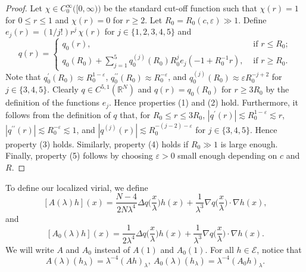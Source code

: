 \documentclass[a4paper,two-side,10pt]{amsart}
\newcommand{\R}{\mathbb{R}}
\numberwithin{equation}{section}
\begin{document}
\begin{proof}
Let $\chi\in C^\infty_0\big([0,\infty)\big)$ be the standard cut-off function such that $\chi(r)=1$ for $0\le r\le 1$ and  $\chi(r)=0$ for $r\ge 2$. Let $R_0=R_0(c,\varepsilon)\gg 1$. Define $e_j(r)=(1/j!)r^j\,\chi(r)$ for $j\in\{1,2,3,4,5\}$ and
\[
q(r)=\begin{cases}
q_0(r), &\text{ if }r\le R_0;\\
q_0(R_0)+\sum_{j=1}^5 q_0^{(j)}(R_0)R_0^j e_j(-1+R_0^{-1}r), &\text{ if }r\ge R_0.
\end{cases}
\]
Note that $q_0^\prime(R_0)\approx R_0^{1-\varepsilon}$,  $q_0^{\prime\prime} (R_0)\approx R_0^{-\varepsilon}$, and 
$q_0^{(j)}(R_0)\approx \varepsilon R_0^{-j+2}$ for $j\in\{3,4,5\}$.
Clearly $q\in C^{5,1} (\R^N)$ and $q(r)=q_0(R_0)$ for $r\ge 3R_0$ by the definition of the functions $e_j$. Hence properties (1) and (2) hold. Furthermore, it follows from the definition of $q$ that, for $R_0\le r\le 3R_0$, $|q^\prime (r)|\lesssim R_0^{1-\varepsilon}\lesssim r$, $|q^{\prime\prime}(r)|\lesssim R_0^{-\varepsilon}\lesssim 1$, and $|q^{(j)}(r)|\lesssim R_0^{-(j-2)-\varepsilon}$ for $j\in\{3,4,5\}$. Hence property (3) holds. Similarly, property (4) holds if $R_0\gg 1$ is large enough. Finally, property (5) follows by choosing $\varepsilon>0$ small enough depending on $c$ and $R$. 

\end{proof}

To define our localized virial, we define
$$[A(\lambda) h](x)= \frac{N-4}{2N\lambda^4}\Delta q \big(\frac{x}{\lambda}\big)h(x)+ \frac{1}{\lambda^3}\nabla q \big(\frac{x}{\lambda}\big)\cdot \nabla h(x),$$
and
$$[A_0 (\lambda)h](x)= \frac{1}{2\lambda^4}\Delta q \big(\frac{x}{\lambda}\big) h(x)+ \frac{1}{\lambda^3} \nabla q \big(\frac{x}{\lambda}\big)\cdot \nabla h (x).$$
We will write $A$ and $A_0$ instead of $A(1)$ and $A_0 (1)$. For all $h\in \mathcal{E}$, notice that
\begin{equation}\label{scaling}
A(\lambda)(h_\lambda)= \lambda^{-4} (Ah)_\lambda,\ A_0 (\lambda) (h_\lambda)= \lambda^{-4} (A_0 h)_\lambda .
\end{equation}
\end{document}
